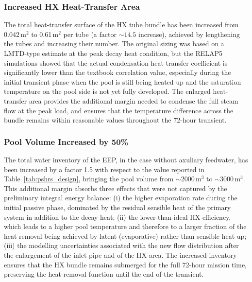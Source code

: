 \documentclass[a4paper,11pt]{article}
\numberwithin{subsubsection}{subsection}
\numberwithin{subsection}{section}
\begin{document}
\subsubsection{Increased HX Heat-Transfer Area}
The total heat-transfer surface of the HX tube bundle has been
increased from 0.042\,m$^{2}$ to 0.61\,m$^{2}$ per tube (a factor
$\sim 14.5$ increase), achieved by lengthening the tubes and
increasing their number. The original sizing was based on a
LMTD-type estimate at the peak decay heat condition, but the
RELAP5 simulations showed that the actual condensation heat
transfer coefficient is significantly lower than the textbook
correlation value, especially during the initial transient phase
when the pool is still being heated up and the saturation
temperature on the pool side is not yet fully developed. The
enlarged heat-transfer area provides the additional margin needed
to condense the full steam flow at the peak load, and ensures that
the temperature difference across the bundle remains within
reasonable values throughout the 72-hour transient.

\subsubsection{Pool Volume Increased by 50\%}
The total water inventory of the EEP, in the case without axuliary feedwater, has been increased by a
factor 1.5 with respect to the value reported in
Table~\ref{tab:pshrs_design}, bringing the pool volume from
$\sim$2000\,m$^{3}$ to $\sim$3000\,m$^{3}$. This additional margin
absorbs three effects that were not captured by the preliminary
integral energy balance: (i) the higher evaporation rate during
the initial passive phase, dominated by the residual sensible
heat of the primary system in addition to the decay heat;
(ii) the lower-than-ideal HX efficiency, which leads to a higher
pool temperature and therefore to a larger fraction of the heat
removal being achieved by latent (evaporative) rather than
sensible heat-up; (iii) the modelling uncertainties associated
with the new flow distribution after the enlargement of the inlet
pipe and of the HX area. The increased inventory ensures that the
HX bundle remains submerged for the full 72-hour mission time,
preserving the heat-removal function until the end of the
transient.
\end{document}
